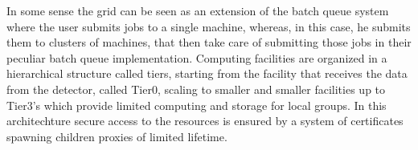In some sense the grid can be seen as an extension of the batch queue system where the user submits jobs to a single machine, whereas, in this case, he submits them to clusters of machines, that then take care of submitting those jobs in their peculiar batch queue implementation. Computing facilities are organized in a hierarchical structure called tiers, starting from the facility that receives the data from the detector, called Tier0, scaling to smaller and smaller facilities up to Tier3's which provide limited computing and storage for local groups. In this architechture secure access to the resources is ensured by a system of certificates spawning children proxies of limited lifetime.


